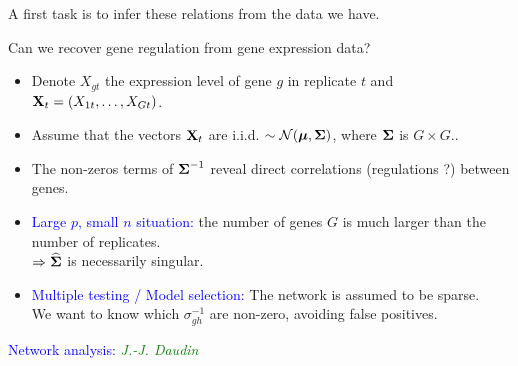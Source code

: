 \documentclass[dvips, lscape]{foils}
\newcommand{\Ncal}{\mathcal{N}}
\newcommand{\Xbf}{{\bf X}}
\newcommand{\mubf}{\mbox{\mathversion{bold}{$\mu$}}}
\newcommand{\Sigmabf}{\mbox{\mathversion{bold}{$\Sigma$}}}
\newcommand{\textblue}[1]{\textcolor{blue}{#1}}
\newcommand{\textgreen}[1]{\textcolor{green}{ #1}}
\newcommand{\refer}[2]{\textgreen{\sl #1}}
\newcommand{\emphase}[1]{\textblue{#1}}
\newcommand{\section}[1]{
  \addtocounter{section}{1}
  \setcounter{subsection}{0}
  {\centerline{\Large \textblue{#1}}}
  }
\newcommand{\paragraph}[1]{\noindent{\textblue{#1}}}
\begin{document}
\noindent A first task is to infer these relations from the data we
have.

\paragraph{Typical question:} Can we recover gene regulation from gene   
expression data? 

\paragraph{Gaussian graphical model.} 
\begin{itemize}
\item \vspace{-0.5cm} Denote $X_{gt}$ the expression level of gene $g$
  in replicate $t$ and $\Xbf_t = (X_{1t}, \dots, X_{Gt})$. 
\item \vspace{-0.5cm} Assume that the vectors $\Xbf_t$ are
  i.i.d. $\sim \Ncal(\mubf, \Sigmabf)$, where $\Sigmabf$ is $G \times G$..
\item \vspace{-0.5cm} The non-zeros terms of $\Sigmabf^{-1}$ reveal
  direct correlations (regulations ?) between genes.
\end{itemize}

\paragraph{(Some) statistical issues.} 
\begin{itemize}
\item \vspace{-0.5cm} \emphase{Large $p$, small $n$ situation:} the
  number of genes $G$ is much larger than the number of replicates. \\
  $\Rightarrow \widehat{\Sigmabf}$ is necessarily singular.
\item \vspace{-0.5cm} \emphase{Multiple testing / Model selection:}
  The network is assumed to be sparse. \\
  We want to know which $\sigma^{-1}_{gh}$ are non-zero, avoiding
  false positives.
\end{itemize}

\newpage
\section{Network analysis: \refer{J.-J. Daudin}{}}
\end{document}
